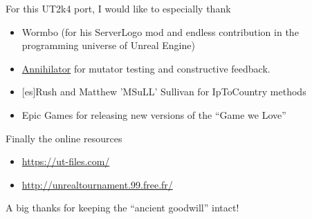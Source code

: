 \documentclass{article}
\begin{document}
For this UT2k4 port, I would like to especially thank
\begin{itemize}
\item Wormbo (for his ServerLogo mod and endless contribution in the programming universe of Unreal Engine)
\item \href{https://github.com/Annihilator}{\color{Blue}Annihilator} for mutator testing and constructive feedback.
\item {[es]}Rush and Matthew 'MSuLL' Sullivan for IpToCountry methods
\item Epic Games for releasing new versions of the ``Game we Love''
\end{itemize}

Finally the online resources
\begin{itemize}
\item \href{https://ut-files.com/}{{\color{Blue}https://ut-files.com/}}
\item \href{http://unrealtournament.99.free.fr/}{{\color{Blue}http://unrealtournament.99.free.fr/}}
\end{itemize}
A big thanks for keeping the ``ancient goodwill'' intact!
\end{document}
